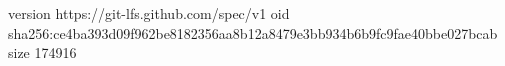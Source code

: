 version https://git-lfs.github.com/spec/v1
oid sha256:ce4ba393d09f962be8182356aa8b12a8479e3bb934b6b9fc9fae40bbe027bcab
size 174916
